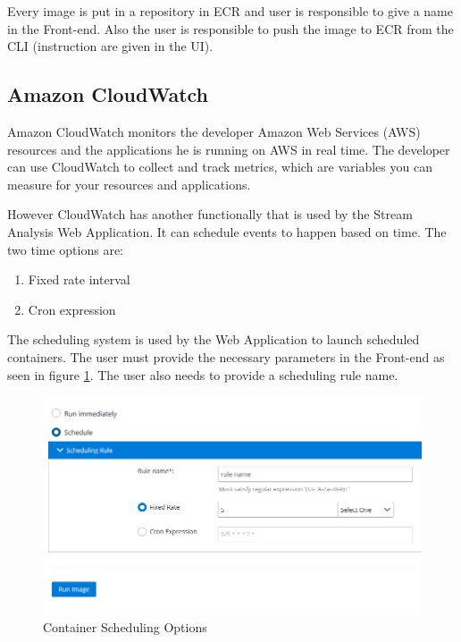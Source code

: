Every image is put in a repository in ECR and user is responsible to give a name in the Front-end. Also the user is responsible to push the image to ECR from the CLI (instruction are given in the UI).

\subsection{Amazon CloudWatch}
\label{chap:04:03:03}

Amazon CloudWatch monitors the developer Amazon Web Services (AWS) resources and the applications he is running on AWS in real time. The developer can use CloudWatch to collect and track metrics, which are variables you can measure for your resources and applications.\cite{aws-cloudwatch}

However CloudWatch has another functionally that is used by the Stream Analysis Web Application. It can schedule events to happen based on time. The two time options are:

\begin{enumerate}
	\item Fixed rate interval
	\item Cron expression
\end{enumerate}

The scheduling system is used by the Web Application to launch scheduled containers. The user must provide the necessary parameters in the Front-end as seen in figure \ref{fig:schedulingOptions}. The user also needs to provide a scheduling rule name.

\begin{figure}[h]
	\centering
	\includegraphics[width=1\linewidth]{./images/webapp/schedulingOptions.PNG}
	\caption{Container Scheduling Options}
	\label{fig:schedulingOptions}
\end{figure}

